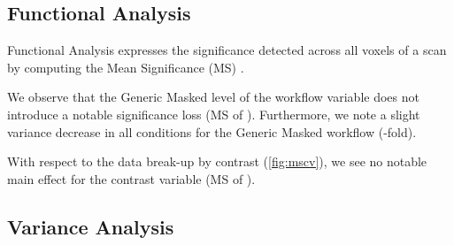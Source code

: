 \subsection{Functional Analysis}

Functional Analysis expresses the significance detected across all voxels of a scan by computing the Mean Significance (MS) \cite{ioanas_optimized_2019}.

We observe that the Generic Masked level of the workflow variable does not introduce a notable significance loss
(MS of ).
Furthermore, we note a slight variance decrease in all conditions for the Generic Masked workflow
(-fold).

With respect to the data break-up by contrast (\cref{fig:mscv}), we see no notable main effect for the contrast variable
(MS of ).


\subsection{Variance Analysis}

